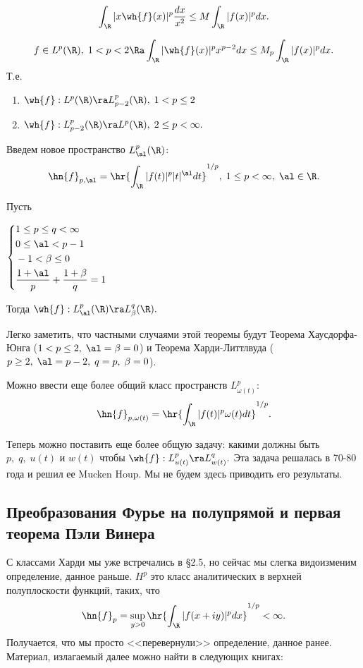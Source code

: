 \documentclass[a4paper]{article}
\begin{document}
$$\int_{\R }|x\wh{f}(x)|^p\frac{dx}{x^2}\le M\int_{\R }|f(x)|^p
dx.$$

\begin{theorem}
$$f\in L^p(\R ),\;1<p<2\Ra
\int_{\R }|\wh{f}(x)|^px^{p-2}dx\le M_p\int_{\R }|f(x)|^pdx.$$ Т.е.
\begin{enumerate}
\item
$\wh{f}:L^p(\R )\ra L^p_{p-2}(\R ),\;1<p\le2$
\item
$\wh{f}:L^p_{p-2}(\R )\ra L^p(\R ),\;2\le p<\infty.$
\end{enumerate}
\end{theorem}

Введем новое пространство $L^p_{\al}(\R )$:
$$\hn{f}_{p,\al}=\hr{\int_{\R }|f(t)|^p|t|^{\al}dt}^{1/p},\;1\le p<\infty,\;\al\in \R .$$
\begin{theorem}[Питт]
Пусть

\begin{center}$\left\{\begin{aligned}
&1\le p\le q<\infty\\
&0\le\al<p-1\\
&-1<\beta\le0\\
&\frac{1+\al}p+\frac{1+\beta}q=1
\end{aligned}\right.$
\end{center}
Тогда $\wh{f}:L^p_{\al}(\R )\ra L^q_{\beta}(\R ).$
\end{theorem}

\begin{wrapfigure}[10]{l}{220pt}
\end{wrapfigure}

Легко заметить, что частными случаями этой теоремы будут Теорема Хаусдорфа-Юнга ($1<p\le2,\;\al=\beta=0$)
и Теорема Харди-Литтлвуда ($p\ge2,\;\al=p-2,\;q=p,\;\beta=0$).

Можно ввести еще более общий класс пространств $L^p_{\omega(t)}$:
$$\hn{f}_{p,\omega(t)}=\hr{\int_{\R }|f(t)|^p\omega(t)dt}^{1/p}.$$

Теперь можно поставить еще более общую задачу: какими должны быть $p,\;q,\;u(t)$ и $w(t)$ чтобы
$\wh{f}:L^p_{u(t)}\ra L^q_{w(t)}.$ Эта задача решалась в 70-80 года и решил ее Mucken Houp. Мы
не будем здесь приводить его результаты.

\subsection{Преобразования Фурье на полупрямой и первая теорема Пэли Винера}
С классами Харди мы уже встречались в \S2.5, но сейчас мы слегка видоизменим определение, данное раньше.
$H^p$ это класс аналитических в верхней полуплоскости функций, таких, что
$$\hn{f}_p=\sup_{y>0}\hr{\int_{\R }|f(x+iy)|^pdx}^{1/p}<\infty. $$
Получается, что мы просто <<перевернули>> определение, данное ранее. Материал, излагаемый далее можно найти в
следующих книгах:
\end{document}
